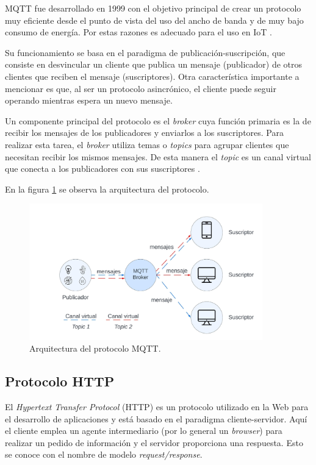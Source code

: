 MQTT fue desarrollado en 1999 con el objetivo principal de crear un protocolo muy eficiente desde el punto de vista del uso del ancho de banda y de muy bajo consumo de energía. Por estas razones es adecuado para el uso en IoT \citep{mqtt:1}.

Su funcionamiento se basa en el paradigma de publicación-suscripción, que consiste en desvincular un cliente que publica un mensaje (publicador) de otros clientes que reciben el mensaje (suscriptores). Otra característica importante a mencionar es que, al ser un protocolo asincrónico, el cliente puede seguir operando mientras espera un nuevo mensaje.

Un componente principal del protocolo es el \textit{broker} cuya función primaria es la de recibir los mensajes de los publicadores y enviarlos a los  suscriptores. Para realizar esta tarea, el \textit{broker} utiliza temas o \textit{topics} para agrupar clientes que necesitan recibir los mismos mensajes. De esta manera el \textit{topic} es un canal virtual que conecta a los publicadores con sus suscriptores \citep{mqtt:1}.

En la figura \ref{fig:arqmqtt} se observa la arquitectura del protocolo.
\begin{figure}[h]
	\centering
	\includegraphics[width=0.90\textwidth]{./Figures/mqtt.jpeg}
	\caption[Arquitectura del protocolo MQTT]{Arquitectura del protocolo MQTT.}
	\label{fig:arqmqtt}

\end{figure}




\subsection{Protocolo HTTP}
\label{sec:Protocolo HTTP}

El \textit{Hypertext Transfer Protocol} (HTTP)\citep{http:1} es un protocolo utilizado en la Web para el desarrollo de aplicaciones y está basado en el paradigma cliente-servidor. Aquí el cliente emplea un agente intermediario (por lo general un \textit{browser}) para realizar un pedido de información y el servidor proporciona una respuesta. Esto se conoce con el nombre de modelo \textit{request/response}.

